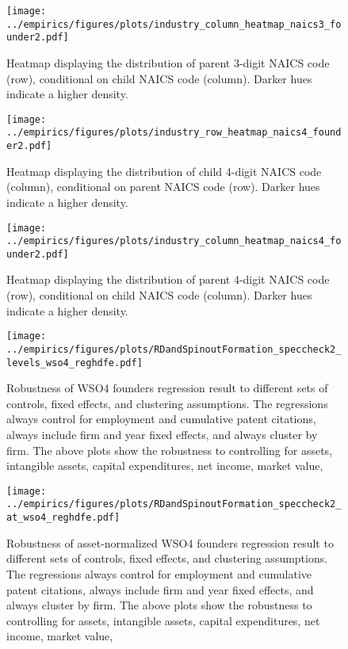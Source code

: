 \documentclass[11pt,english]{article}
\begin{document}
\begin{figure}[!htb]
	\centering
	\texttt{[image: ../empirics/figures/plots/industry\_column\_heatmap\_naics3\_founder2.pdf]}
	\caption{Heatmap displaying the distribution of parent 3-digit NAICS code (row), conditional on child NAICS code (column). Darker hues indicate a higher density.}
	\label{figure:industry_column_heatmap_naics3_founder2}
\end{figure}

\begin{figure}[!htb]
	\centering
	\texttt{[image: ../empirics/figures/plots/industry\_row\_heatmap\_naics4\_founder2.pdf]}
	\caption{Heatmap displaying the distribution of child 4-digit NAICS code (column), conditional on parent NAICS code (row). Darker hues indicate a higher density.}
	\label{figure:industry_row_heatmap_naics4_founder2}
\end{figure}

\begin{figure}[!htb]
	\centering
	\texttt{[image: ../empirics/figures/plots/industry\_column\_heatmap\_naics4\_founder2.pdf]}
	\caption{Heatmap displaying the distribution of parent 4-digit NAICS code (row), conditional on child NAICS code (column). Darker hues indicate a higher density.}
	\label{figure:industry_column_heatmap_naics4_founder2}
\end{figure}

\begin{figure}[!htb]
	\centering
	\texttt{[image: ../empirics/figures/plots/RDandSpinoutFormation\_speccheck2\_levels\_wso4\_reghdfe.pdf]}
	\caption{Robustness of WSO4 founders regression result to different sets of controls, fixed effects, and clustering assumptions. The regressions always control for employment and cumulative patent citations, always include firm and year fixed effects, and always cluster by firm. The above plots show the robustness to controlling for assets, intangible assets, capital expenditures, net income, market value, }
	\label{figure:speccheck2_levels_wso4_reghdfe}
\end{figure}

\begin{figure}[!htb]
	\centering
	\texttt{[image: ../empirics/figures/plots/RDandSpinoutFormation\_speccheck2\_at\_wso4\_reghdfe.pdf]}
	\caption{Robustness of asset-normalized WSO4 founders regression result to different sets of controls, fixed effects, and clustering assumptions. The regressions always control for employment and cumulative patent citations, always include firm and year fixed effects, and always cluster by firm. The above plots show the robustness to controlling for assets, intangible assets, capital expenditures, net income, market value, }
	\label{figure:speccheck2_at_wso4_reghdfe}
\end{figure}
\end{document}

